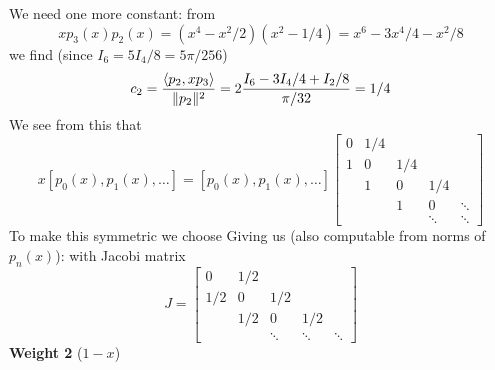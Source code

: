 \documentclass[12pt,a4paper]{article}
\begin{document}
We need one more constant:  from
\[
x p_3(x) p_2(x) = (x^4-x^2/2)(x^2-1/4) = x^6 - 3x^4/4 - x^2/8
\]
we find (since $I_6 = 5I_4/8 =5\ensuremath{\pi}/256$)
\[
c_2 = \frac{\ensuremath{\langle} p_2,xp_3\ensuremath{\rangle}}{\|p_2\|^2}=2{I_6-3I_4/4 + I_2/8 \over \ensuremath{\pi}/32} =1/4
\]
We see from this that
\[
x [p_0(x),p_1(x),\ensuremath{\ldots}] = [p_0(x),p_1(x),\ensuremath{\ldots}] \begin{bmatrix} 0 & 1/4 \\
                                                        1 & 0 & 1/4 \\
                                                          & 1 & 0  & 1/4 \\
                                                          && 1 & 0  & \ensuremath{\ddots} \\
                                                          &&& \ensuremath{\ddots} & \ensuremath{\ddots}
                                                          \end{bmatrix}
\]
To make this symmetric we choose
Giving us (also computable from norms of $p_n(x)$):
with Jacobi matrix
\[
J = \begin{bmatrix} 0 & 1/2 \\
                    1/2 & 0 & 1/2 \\
                        & 1/2 & 0  & 1/2 \\
                        && \ensuremath{\ddots} & \ensuremath{\ddots}  & \ensuremath{\ddots}
                        \end{bmatrix}
\]
\textbf{Weight 2} ($1-x$)
\end{document}
